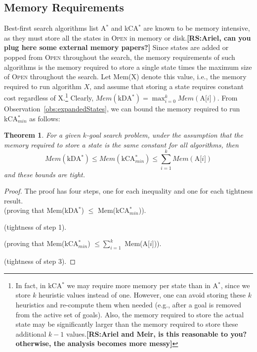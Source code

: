 \documentclass{aicom2e}
\newtheorem{theorem}{Theorem}
\newcommand{\kgs}{$k$-goal search}
\newcommand{\astar}{A$^*$}
\newcommand{\kastar}{kCA$^*$}
\newcommand{\kastarmin}{kCA$^*_{min}$}
\newcommand{\kxastar}{kDA$^*$}
\newcommand{\astari}[1]{A[$#1$]}
\newcommand{\open}{\textsc{Open}}
\newcommand{\roni}[1]{\textbf{[RS:#1]}}
\begin{document}
\subsection{Memory Requirements}
Best-first search algorithms list \astar{} and \kastar{} are known to be memory
intensive, as they must store all the states in \open{} in memory or
disk.\roni{Ariel, can you plug here some external memory papers?} Since states
are added or popped from \open{} throughout the search, the memory requirements
of such algorithms is the memory required to store a single state times the
maximum size of \open{} throughout the search. Let Mem(X) denote this value,
i.e., the memory required to run algorithm $X$, and assume that storing a state
requires constant cost regardless of X.\footnote{In fact, in \kastar{} we may
require more memory per state than in \astar{}, since we store $k$ heuristic
values instead of one. However, one can avoid storing these $k$ heuristics and
re-compute them when needed (e.g., after a goal is removed from the active set
of goals). Also, the memory required to store the actual state may be
significantly larger than the memory required to store these additional $k-1$
values.\roni{Ariel and Meir, is this reasonable to you? otherwise, the analysis
becomes more messy}} Clearly, $Mem(\text{\kxastar{}})=\max_{i=0}^k
Mem(\text{\astari{i}})$.
From Observation~\ref{obs:expandedStates}, we can bound the memory required
to run \kastarmin{} as follows:
\begin{theorem}
For a given \kgs{} problem, under the assumption that the memory required to store a state is the same constant for all algorithms, then
\[ Mem(\text{\kxastar{}})\leq Mem(\text{\kastarmin})\leq \sum_{i=1}^k Mem(\text{\astari{i}}) \]
and these bounds are tight.
\label{the:memory}
\end{theorem}
\begin{proof}
    The proof has four steps, one for each inequality and one for each tightness result.\\
     (proving that Mem(\kxastar{}) $\leq$ Mem(\kastarmin)).


     (tightness of step 1).


     (proving that Mem(\kastarmin) $\leq \sum_{i=1}^k$ Mem(\astari{i})).


     (tightness of step 3).


\end{proof}
\end{document}
